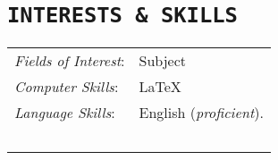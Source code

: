 \documentclass{sty/CV_Class}
\begin{document}

\section{\texttt{INTERESTS \& SKILLS}}
\begin{tabular}{ l l }
 \textit{Fields of Interest}: & Subject \\ [0.5em]
 \textit{Computer Skills}: & \LaTeX \\ [0.5em]
 \textit{Language Skills}: & English (\textit{proficient}).\\~\\     
\end{tabular}


\end{document}

